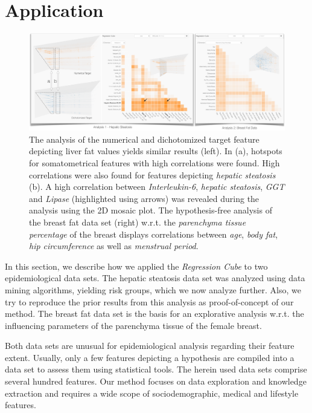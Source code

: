 \documentclass[journal]{style/vgtc} 			          %
\begin{document}
\section{Application} \label{application}
\begin{figure}[htb]
 \centering
 \includegraphics[width=1.0\linewidth]{figures/application}
 \caption{
 The analysis of the numerical and dichotomized target feature depicting liver fat values yields similar results (left).
 In (a), hotspots for somatometrical features with high correlations were found.
 High correlations were also found for features depicting \emph{hepatic steatosis} (b).
 A high correlation between \emph{Interleukin-6}, \emph{hepatic steatosis}, \emph{GGT} and \emph{Lipase} (highlighted using arrows) was revealed during the analysis using the 2D mosaic plot.
 The hypothesis-free analysis of the breast fat data set (right) w.r.t. the \emph{parenchyma tissue percentage} of the breast displays correlations between \emph{age}, \emph{body fat}, \emph{hip circumference} as well as \emph{menstrual period}.
 }
  \label{fig:Application}
\end{figure}
In this section, we describe how we applied the \emph{Regression Cube} to two epidemiological data sets.
The hepatic steatosis data set was analyzed using data mining algorithms, yielding risk groups, which we now analyze further.
Also, we try to reproduce the prior results from this analysis as proof-of-concept of our method.
The breast fat data set is the basis for an explorative analysis w.r.t. the influencing parameters of the parenchyma tissue of the female breast.

Both data sets are unusual for epidemiological analysis regarding their feature extent.
Usually, only a few features depicting a hypothesis are compiled into a data set to assess them using statistical tools.
The herein used data sets comprise several hundred features.
Our method focuses on data exploration and knowledge extraction and requires a wide scope of sociodemographic, medical and lifestyle features.
\end{document}
